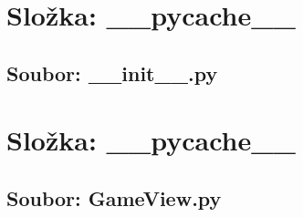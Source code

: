 \documentclass{article}
\begin{document}
\section*{Složka: \_\_pycache\_\_}
\subsection*{Soubor: __init__.py}
\begin{itemize}
\end{itemize}
\section*{Složka: \_\_pycache\_\_}
\subsection*{Soubor: GameView.py}
\end{document}
